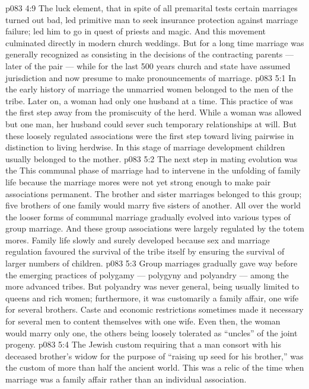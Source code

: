 \vs p083 4:9 The luck element, that in spite of all premarital tests certain marriages turned out bad, led primitive man to seek insurance protection against marriage failure; led him to go in quest of priests and magic. And this movement culminated directly in modern church weddings. But for a long time marriage was generally recognized as consisting in the decisions of the contracting parents --- later of the pair --- while for the last 500 years church and state have assumed jurisdiction and now presume to make pronouncements of marriage.
\vs p083 5:1 In the early history of marriage the unmarried women belonged to the men of the tribe. Later on, a woman had only one husband at a time. This practice of  was the first step away from the promiscuity of the herd. While a woman was allowed but one man, her husband could sever such temporary relationships at will. But these loosely regulated associations were the first step toward living pairwise in distinction to living herdwise. In this stage of marriage development children usually belonged to the mother.
\vs p083 5:2 The next step in mating evolution was the  This communal phase of marriage had to intervene in the unfolding of family life because the marriage mores were not yet strong enough to make pair associations permanent. The brother and sister marriages belonged to this group; five brothers of one family would marry five sisters of another. All over the world the looser forms of communal marriage gradually evolved into various types of group marriage. And these group associations were largely regulated by the totem mores. Family life slowly and surely developed because sex and marriage regulation favoured the survival of the tribe itself by ensuring the survival of larger numbers of children.
\vs p083 5:3 Group marriages gradually gave way before the emerging practices of polygamy --- polygyny and polyandry --- among the more advanced tribes. But polyandry was never general, being usually limited to queens and rich women; furthermore, it was customarily a family affair, one wife for several brothers. Caste and economic restrictions sometimes made it necessary for several men to content themselves with one wife. Even then, the woman would marry only one, the others being loosely tolerated as “uncles” of the joint progeny.
\vs p083 5:4 The Jewish custom requiring that a man consort with his deceased brother’s widow for the purpose of “raising up seed for his brother,” was the custom of more than half the ancient world. This was a relic of the time when marriage was a family affair rather than an individual association.
